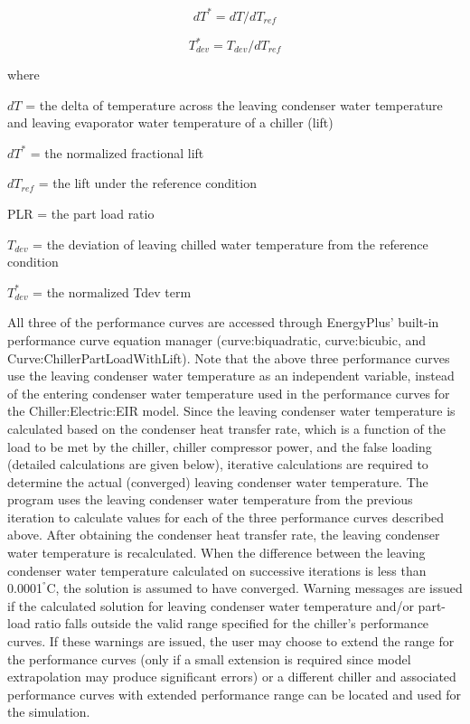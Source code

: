 \begin{equation}
dT^* = dT / dT_{ref}
\end{equation}

\begin{equation}
T_{dev}^* = T_{dev} / dT_{ref}
\end{equation}

where

\(dT\) = the delta of temperature across the leaving condenser water temperature and leaving evaporator water temperature of a chiller (lift)

\(dT^*\) = the normalized fractional lift

\(dT_{ref}\) = the lift under the reference condition

PLR = the part load ratio

\(T_{dev}\) = the deviation of leaving chilled water temperature from the reference condition

\(T_{dev}^*\) = the normalized Tdev term

All three of the performance curves are accessed through EnergyPlus' built-in performance curve equation manager (curve:biquadratic, curve:bicubic, and Curve:ChillerPartLoadWithLift). Note that the above three performance curves use the leaving condenser water temperature as an independent variable, instead of the entering condenser water temperature used in the performance curves for the Chiller:Electric:EIR model. Since the leaving condenser water temperature is calculated based on the condenser heat transfer rate, which is a function of the load to be met by the chiller, chiller compressor power, and the false loading (detailed calculations are given below), iterative calculations are required to determine the actual (converged) leaving condenser water temperature. The program uses the leaving condenser water temperature from the previous iteration to calculate values for each of the three performance curves described above. After obtaining the condenser heat transfer rate, the leaving condenser water temperature is recalculated. When the difference between the leaving condenser water temperature calculated on successive iterations is less than 0.0001\(^{°}\)C, the solution is assumed to have converged. Warning messages are issued if the calculated solution for leaving condenser water temperature and/or part-load ratio falls outside the valid range specified for the chiller's performance curves. If these warnings are issued, the user may choose to extend the range for the performance curves (only if a small extension is required since model extrapolation may produce significant errors) or a different chiller and associated performance curves with extended performance range can be located and used for the simulation.


